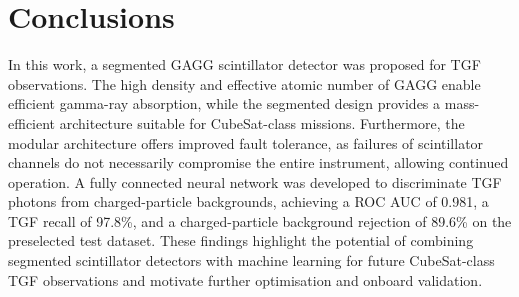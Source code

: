\documentclass[11pt,twoside]{article}
\begin{document}
\section{Conclusions}
In this work, a segmented GAGG scintillator detector was proposed for TGF observations. The high density and effective atomic number of GAGG enable efficient gamma-ray absorption, while the segmented design provides a mass-efficient architecture suitable for CubeSat-class missions. Furthermore, the modular architecture offers improved fault tolerance, as failures of scintillator channels do not necessarily compromise the entire instrument, allowing continued operation. A fully connected neural network was developed to discriminate TGF photons from charged-particle backgrounds, achieving a ROC AUC of 0.981, a TGF recall of 97.8\%, and a charged-particle background rejection of 89.6\% on the preselected test dataset. These findings highlight the potential of combining segmented scintillator detectors with machine learning for future CubeSat-class TGF observations and motivate further optimisation and onboard validation.



\end{document}
